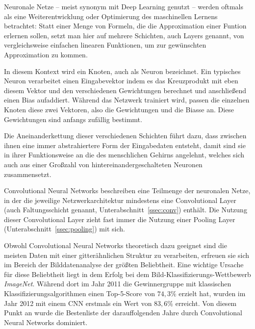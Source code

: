 Neuronale Netze -- meist synonym mit Deep Learning genutzt -- werden oftmals als eine Weiterentwicklung oder Optimierung des maschinellen Lernens betrachtet: Statt einer Menge von Formeln, die die Approximation einer Funtion erlernen sollen, setzt man hier auf mehrere Schichten, auch Layers genannt, von vergleichsweise einfachen linearen Funktionen, um zur gewünschten Approximation zu kommen. \cite{hardesty_17}

In diesem Kontext wird ein Knoten, auch als Neuron bezeichnet. Ein typisches Neuron verarbeitet einen Eingabevektor indem es das Kreuzprodukt mit eben diesem Vektor und den verschiedenen Gewichtungen berechnet und anschließend einen Bias aufaddiert. Während das Netzwerk trainiert wird, passen die einzelnen Knoten diese zwei Vektoren, also die Gewichtungen und die Biasse an. Diese Gewichtungen sind anfangs zufällig bestimmt. \cite{hardesty_17, cs231n}

Die Aneinanderkettung dieser verschiedenen Schichten führt dazu, dass zwischen ihnen eine immer abstrahiertere Form der Eingabedaten entsteht, damit sind sie in ihrer Funktionsweise an die des menschlichen Gehirns angelehnt, welches sich auch aus einer Großzahl von hintereinandergeschalteten Neuronen zusammensetzt. %

Convolutional Neural Networks beschreiben eine Teilmenge der neuronalen Netze, in der die jeweilige Netzwerkarchitektur mindestens eine Convolutional Layer (auch Faltungsschicht genannt, \vgl Unterabschnitt~\ref{ssec:conv}) enthält. Die Nutzung dieser Convolutional Layer zieht fast immer die Nutzung einer Pooling Layer (Unterabschnitt~\ref{ssec:pooling}) mit sich. \cite{deeplearning_16}

Obwohl Convolutional Neural Networks theoretisch dazu geeignet sind die meisten Daten mit einer gitterähnlichen Struktur zu verarbeiten, erfreuen sie sich im Bereich der Bilddatenanalyse der größten Beliebtheit. \cite[Kap.~9]{deeplearning_16} Eine wichtige Ursache für diese Beliebtheit liegt \bspw in dem Erfolg bei dem Bild-Klassifizierungs-Wettbewerb \textit{ImageNet}. Während dort im Jahr 2011 die Gewinnergruppe mit klassischen Klassifizierungsalgorithmen einen Top-5-Score von $74,3\%$ erzielt hat, wurden im Jahr 2012 mit einem CNN erstmals ein Wert von $83,6\%$ erreicht. Von diesem Punkt an wurde die Bestenliste der darauffolgenden Jahre durch Convolutional Neural Networks dominiert. \cite[Kap.~1]{deeplearning_18}


